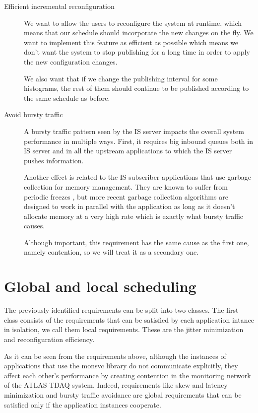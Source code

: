 \begin{description}
\item [Efficient incremental reconfiguration]

We want to allow the users to reconfigure the system at runtime, which means that our schedule should incorporate the new changes on the fly. We want to implement this feature as efficient as possible which means we don’t want the system to stop publishing for a long time in order to apply the new configuration changes. 

We also want that if we change the publishing interval for some histograms, the rest of them should continue to be published according to the same schedule as before.

\item [Avoid bursty traffic]

A bursty traffic pattern seen by the IS server impacts the overall system performance in multiple ways. First, it requires big inbound queues both in IS server and in all the upstream applications to which the IS server pushes information. 

Another effect is related to the IS subscriber applications that use garbage collection for memory management. They are known to suffer from periodic freezes \citep{aho2007compilers}, but more recent garbage collection algorithms \citep{printezis2005garbage} are designed to work in parallel with the application as long as it doesn’t allocate memory at a very high rate which is exactly what bursty traffic causes.

Although important, this requirement has the same cause as the first one, namely contention, so we will treat it as a secondary one.

\end{description}

\section*{Global and local scheduling}

The previously identified requirements can be split into two classes. The first class consists of the requirements that can be satisfied by each application intance in isolation, we call them local requirements. These are the jitter minimization and reconfiguration efficiency. 

As it can be seen from the requirements above, although the instances of applications that use the monsvc library do not communicate explicitly, they affect each other’s performance by creating contention in the monitoring network of the ATLAS TDAQ system. Indeed, requirements like skew and latency minimization and bursty traffic avoidance are global requirements that can be satisfied only if the application instances cooperate.

